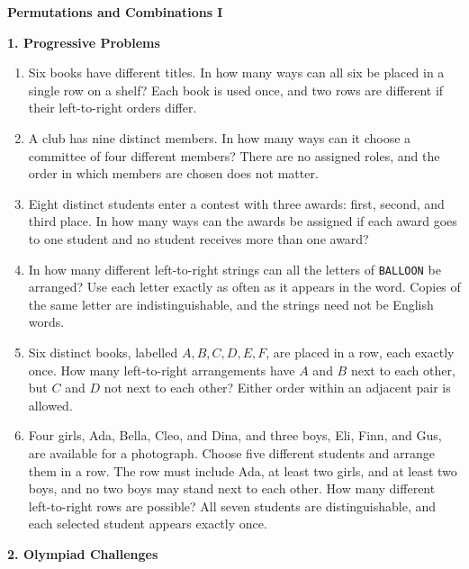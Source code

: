 \documentclass[11pt]{article}
\newcommand{\stageheading}[1]{%
  \par\Needspace{6\baselineskip}%
  \addvspace{.65\baselineskip}%
  {\centering\large\bfseries #1\par}%
  \nopagebreak[4]}
\begin{document}
\vspace*{0pt}
{\centering\Large\bfseries Permutations and Combinations I\par}

\stageheading{1. Progressive Problems}

\begin{enumerate}[label=\textbf{\arabic*.}]
\item Six books have different titles. In how many ways can all six be
placed in a single row on a shelf? Each book is used once, and two rows
are different if their left-to-right orders differ.

\item A club has nine distinct members. In how many ways can it choose
a committee of four different members? There are no assigned roles, and
the order in which members are chosen does not matter.

\item Eight distinct students enter a contest with three awards: first,
second, and third place. In how many ways can the awards be assigned if
each award goes to one student and no student receives more than one award?

\item In how many different left-to-right strings can all the letters of
\texttt{BALLOON} be arranged? Use each letter exactly as often as it appears
in the word. Copies of the same letter are indistinguishable, and the
strings need not be English words.

\item Six distinct books, labelled $A,B,C,D,E,F$, are placed in a row,
each exactly once. How many left-to-right arrangements have $A$ and $B$
next to each other, but $C$ and $D$ not next to each other? Either order
within an adjacent pair is allowed.

\item Four girls, Ada, Bella, Cleo, and Dina, and three boys, Eli, Finn,
and Gus, are available for a photograph. Choose five different students
and arrange them in a row. The row must include Ada, at least two girls,
and at least two boys, and no two boys may stand next to each other.
How many different left-to-right rows are possible? All seven students
are distinguishable, and each selected student appears exactly once.
\end{enumerate}

\stageheading{2. Olympiad Challenges}
\end{document}
